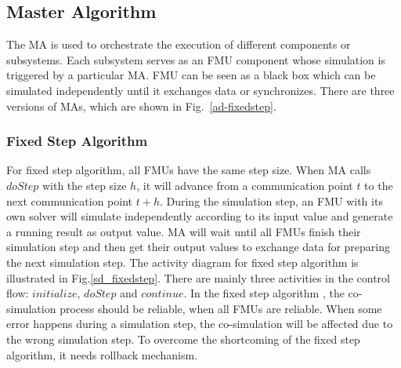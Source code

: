 \subsection{Master Algorithm}
The MA is used to orchestrate the execution of different components or subsystems. Each subsystem serves as an FMU component whose simulation is triggered by a particular MA. FMU can be seen as a black box which can be simulated independently until it exchanges data or synchronizes. There are three versions of MAs, which are shown in Fig.~\ref{ad-fixedstep}.
\begin{figure}[htbp]
\end{figure}
\subsubsection{Fixed Step Algorithm}
For fixed step algorithm, all FMUs have the same step size. When MA calls $doStep$ with the step size $h$, it will advance from a communication point $t$ to the next communication point $t+h$. During the simulation step, an FMU with its own solver will simulate independently according to its input value and generate a running result as output value. MA will wait until all FMUs finish their simulation step and then get their output values to exchange data for preparing the next simulation step. The activity diagram for fixed step algorithm is illustrated in Fig.\ref{sd_fixedstep}. There are mainly three activities in the control flow: $initialize$, $doStep$ and $continue$. In the fixed step algorithm \cite{BromanBGLMTW13}, the co-simulation process should be reliable, when all FMUs are reliable. When some error happens during a simulation step, the co-simulation will be affected due to the wrong simulation step. To overcome the shortcoming of the fixed step algorithm, it needs rollback mechanism.
